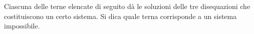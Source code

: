 Ciascuna delle terne elencate di seguito dà le soluzioni delle tre 
disequazioni che costituiscono un certo sistema.
Si dica quale terna corrisponde a un sistema impossibile.